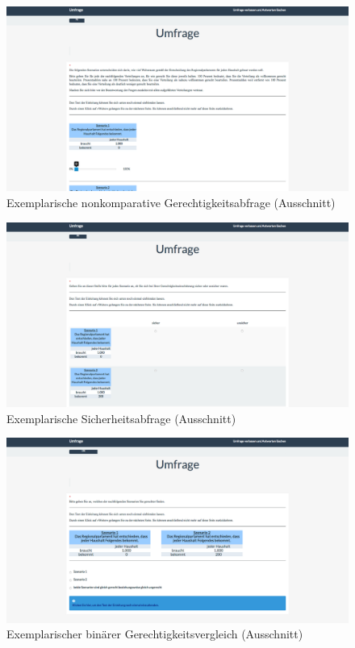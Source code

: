 \documentclass[a4paper]{thesis}
\begin{document}
\begin{figure}[H]
\centering
\includegraphics[width=1\textwidth]{figures/lime_5.png}
\caption[Exemplarische nonkomparative Gerechtigkeitsabfrage (Ausschnitt)]{Exemplarische nonkomparative Gerechtigkeitsabfrage (Ausschnitt)}
\end{figure}

\begin{figure}[H]
\centering
\includegraphics[width=1\textwidth]{figures/lime_6.png}
\caption[Exemplarische Sicherheitsabfrage (Ausschnitt)]{Exemplarische Sicherheitsabfrage (Ausschnitt)}
\end{figure}

\begin{figure}[H]
\centering
\includegraphics[width=1\textwidth]{figures/lime_7.png}
\caption[Exemplarischer binärer Gerechtigkeitsvergleich (Ausschnitt)]{Exemplarischer binärer Gerechtigkeitsvergleich (Ausschnitt)}
\end{figure}
\end{document}
